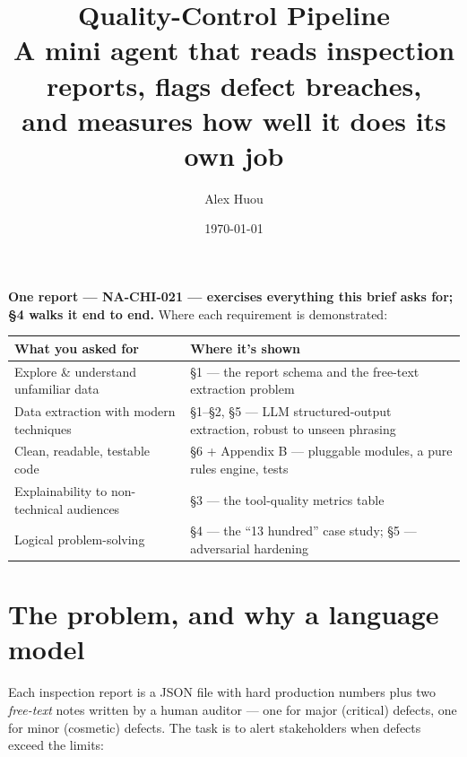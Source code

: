 \documentclass[11pt]{article}
\title{\vspace{-1.2cm}\color{accent}\bfseries Quality-Control Pipeline\\[2pt]
\large\mdseries A mini agent that reads inspection reports, flags defect breaches,\\and measures how well it does its own job}
\author{Alex Huou}
\date{\today}
\begin{document}
\maketitle
\vspace{-0.8cm}

\begin{center}\end{center}

\medskip
\noindent\textbf{One report --- NA-CHI-021 --- exercises everything this brief asks for; \S4 walks it end to end.}
Where each requirement is demonstrated:

\begin{center}\small
\begin{tabularx}{\linewidth}{@{}l X@{}}
\toprule
\textbf{What you asked for} & \textbf{Where it's shown}\\
\midrule
Explore \& understand unfamiliar data & \S1 --- the report schema and the free-text extraction problem\\
Data extraction with modern techniques & \S1--\S2, \S5 --- LLM structured-output extraction, robust to unseen phrasing\\
Clean, readable, testable code & \S6 + Appendix B --- pluggable modules, a pure rules engine, \nTests{} tests\\
Explainability to non-technical audiences & \S3 --- the tool-quality metrics table\\
Logical problem-solving & \S4 --- the ``13 hundred'' case study; \S5 --- adversarial hardening\\
\bottomrule
\end{tabularx}
\end{center}

\section{The problem, and why a language model}
Each inspection report is a JSON file with hard production numbers plus two
\emph{free-text} notes written by a human auditor --- one for major (critical) defects,
one for minor (cosmetic) defects. The task is to alert stakeholders when defects exceed
the limits:
\end{document}
